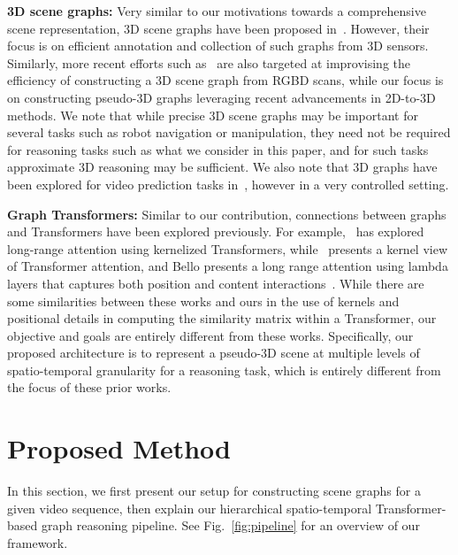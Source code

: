 \documentclass[letterpaper]{article}
\begin{document}
\noindent\textbf{3D scene graphs:} Very similar to our motivations towards a comprehensive scene representation, 3D scene graphs have been proposed in~\cite{armeni20193d}. However, their focus is on efficient annotation and collection of such graphs from 3D sensors. Similarly, more recent efforts such as~\cite{zhang2021exploiting,wu2021scenegraphfusion} are also targeted at improvising the efficiency of constructing a 3D scene graph from RGBD scans, while our focus is on constructing pseudo-3D graphs leveraging recent advancements in 2D-to-3D methods. We note that while precise 3D scene graphs may be important for several tasks such as robot navigation or manipulation, they need not be required for reasoning tasks such as what we consider in this paper, and for such tasks approximate 3D reasoning may be sufficient. We also note that 3D graphs have been explored for video prediction tasks in~\cite{tung20203d}, however in a very controlled setting.

\noindent\textbf{Graph Transformers:} Similar to our contribution, connections between graphs and Transformers have been explored previously. For example,~\cite{choromanski2021graph} has explored long-range attention using kernelized Transformers, while~\cite{tsai2019Transformer} presents a kernel view of Transformer attention, and Bello presents a long range attention using lambda layers that captures both position and content interactions~\cite{bello2021lambdanetworks}. While there are some similarities between these works and ours in the use of kernels and positional details in computing the similarity matrix within a Transformer, our objective and goals are entirely different from these works. Specifically, our proposed architecture is to represent a pseudo-3D scene at multiple levels of spatio-temporal granularity for a reasoning task, which is entirely different from the focus of these prior works.
\section{Proposed Method}
In this section, we first present our setup for constructing \name scene graphs for a given video sequence, then explain our hierarchical spatio-temporal Transformer-based graph reasoning pipeline. See Fig.~\ref{fig:pipeline} for an overview of our framework.
\end{document}
